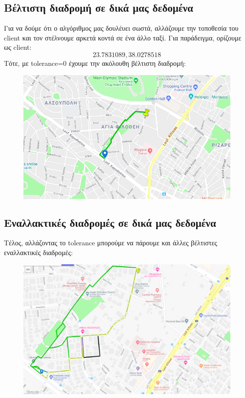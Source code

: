 \documentclass[a4paper,oneside, 11pt]{article}
\begin{document}
\subsection{Βέλτιστη διαδρομή σε δικά μας δεδομένα}
Για να δούμε ότι ο αλγόριθμος μας δουλέυει σωστά, αλλάζουμε την τοποθεσία του client και τον στέλνουμε αρκετά κοντά σε ένα άλλο ταξί. Για παράδειγμα, ορίζουμε ως client:
$$
23.7831089,38.0278518
$$
Τότε, με tolerance=0 έχουμε την ακόλουθη βέλτιστη διαδρομή:

\begin{figure}[H]
\includegraphics[width=\textwidth]{solution_custom.png}
\end{figure}


\subsection{Εναλλακτικές διαδρομές σε δικά μας δεδομένα}
Τέλος, αλλάζοντας το tolerance μπορούμε να πάρουμε και άλλες βέλτιστες εναλλακτικές διαδρομές:

\begin{figure}[H]
\includegraphics[width=\textwidth]{alt4.png}
\end{figure}
\end{document}
